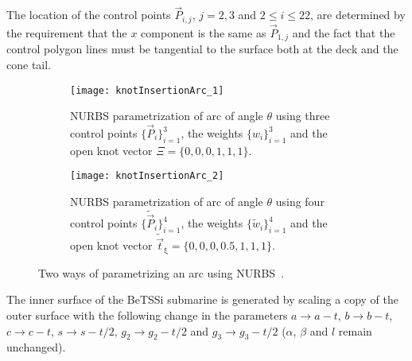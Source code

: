 The location of the control points $\vec{P}_{i,j}$, $j=2,3$ and $2\leq i\leq 22$, are determined by the requirement that the $x$ component is the same as $\vec{P}_{1,j}$ and the fact that the control polygon lines must be tangential to the surface both at the deck and the cone tail.
\begin{figure}
	\centering    
	\begin{subfigure}[t]{0.44\textwidth}
		\centering
		\texttt{[image: knotInsertionArc\_1]}
		\caption{NURBS parametrization of arc of angle $\theta$ using three control points $\{\vec{P}_i\}_{i=1}^3$, the weights $\{w_i\}_{i=1}^3$ and the open knot vector $\Xi=\{0,0,0,1,1,1\}$.}
		\label{Fig2:arcParam1}
	\end{subfigure}%
	\hspace*{0.02\textwidth}%
	\begin{subfigure}[t]{0.54\textwidth}
		\centering
		\texttt{[image: knotInsertionArc\_2]}
		\caption{NURBS parametrization of arc of angle $\theta$ using four control points $\{\tilde{\vec{P}}_i\}_{i=1}^4$, the weights $\{\tilde{w}_i\}_{i=1}^4$ and the open knot vector $\tilde{\vec{t}}_\upxi=\{0,0,0,0.5,1,1,1\}$.}
		\label{Fig2:arcParam2}
	\end{subfigure}%
	\caption{Two ways of parametrizing an arc using NURBS~\cite[p. 315]{Piegl1997tnb}.}
\end{figure}

The inner surface of the BeTSSi submarine is generated by scaling a copy of the outer surface with the following change in the parameters $a\to a-t$, $b\to b-t$, $c\to c-t$, $s\to s-t/2$,  $g_2\to g_2-t/2$ and $g_3\to g_3-t/2$ ($\alpha$, $\beta$ and $l$ remain unchanged).